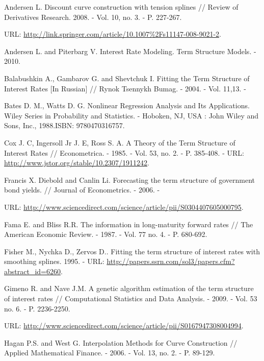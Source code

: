 \documentclass[10pt]{article}
\begin{document}
Andersen L. Discount curve construction with tension splines // Review of Derivatives Research. 2008. - Vol. 10, no. 3. - P. 227-267.

URL: \href{http://link.springer.com/article/10.1007%2Fs11147-008-9021-2}{http://link.springer.com/article/10.1007\%2Fs11147-008-9021-2}.

Andersen L. and Piterbarg V. Interest Rate Modeling. Term Structure Models. - 2010.

Balabushkin A., Gambarov G. and Shevtchuk I. Fitting the Term Structure of Interest Rates [In Russian] // Rynok Tsennykh Bumag. - 2004. - Vol. 11,13. -

Bates D. M., Watts D. G. Nonlinear Regression Analysis and Its Applications. Wiley Series in Probability and Statistics. - Hoboken, NJ, USA : John Wiley and Sons, Inc., 1988.ISBN: 9780470316757.

Cox J. C, Ingersoll Jr J. E, Ross S. A. A Theory of the Term Structure of Interest Rates // Econometrica. - 1985. - Vol. 53, no. 2. - P. 385-408. - URL: \href{http://www.jstor.org/stable/10.2307/1911242}{http://www.jstor.org/stable/10.2307/1911242}.

Francis X. Diebold and Canlin Li. Forecasting the term structure of government bond yields. // Journal of Econometrics. - 2006. -

URL: \href{http://www.sciencedirect.com/science/article/pii/S0304407605000795}{http://www.sciencedirect.com/science/article/pii/S0304407605000795}.

Fama E. and Bliss R.R. The information in long-maturity forward rates // The American Economic Review. - 1987. - Vol. 77 no. 4. - P. 680-692.

Fisher M., Nychka D., Zervos D.. Fitting the term structure of interest rates with smoothing splines. 1995. - URL: \href{http://papers.ssrn.com/sol3/papers.cfm?abstract_id=6260}{http://papers.ssrn.com/sol3/papers.cfm?abstract\_id=6260}.

Gimeno R. and Nave J.M. A genetic algorithm estimation of the term structure of interest rates // Computational Statistics and Data Analysis. - 2009. - Vol. 53 no. 6. - P. 2236-2250.

URL: \href{http://www.sciencedirect.com/science/article/pii/S0167947308004994}{http://www.sciencedirect.com/science/article/pii/S0167947308004994}.

Hagan P.S. and West G. Interpolation Methods for Curve Construction // Applied Mathematical Finance. - 2006. - Vol. 13, no. 2. - P. 89-129.
\end{document}
